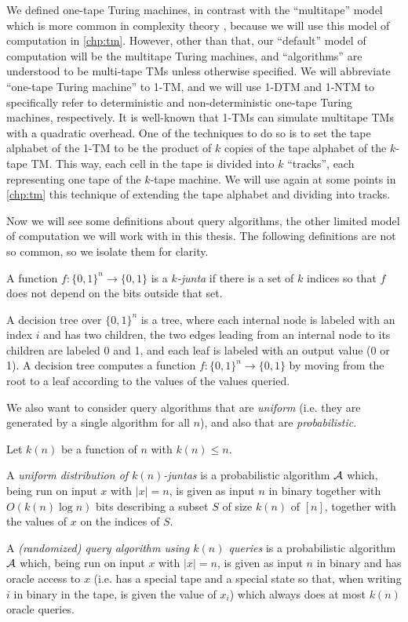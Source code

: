 We defined one-tape Turing machines, in contrast with the 
``multitape'' model which is more common in complexity theory \cite{AB09}, because 
we will use this model of computation in \cref{chp:tm}. However, other than that, 
our ``default'' model of computation will be the multitape Turing machines, and 
``algorithms'' are understood to be multi-tape TMs unless otherwise specified. 
We will abbreviate 
``one-tape Turing machine'' to 1-TM, and we will use 1-DTM and 1-NTM to specifically 
refer to deterministic and non-deterministic one-tape Turing machines, respectively.
It is well-known that 1-TMs can simulate multitape TMs with a quadratic overhead. 
One of the techniques to do so is to set the tape alphabet of the 1-TM to be the product
of $k$ copies of the tape alphabet of the $k$-tape TM. This way, each cell in the tape is divided 
into $k$ ``tracks'', each representing one tape of the $k$-tape machine. We will use again
at some points in \cref{chp:tm}
this technique of extending the tape alphabet and dividing into tracks. 

Now we will see some definitions about query algorithms, the other limited 
model of computation we will work with in this thesis. 
The following definitions are not so common, so we isolate them for clarity.

\begin{definition}
	A function $f \colon \{0, 1\}^n \to \{0, 1\}$ is a \emph{$k$-junta} if there is a set of $k$ indices
	so that $f$ does not depend on the bits outside that set.

	A decision tree over $\{0, 1\}^n$ is a tree, where each internal node
is labeled with an index $i$ and has two children, the two edges leading from an internal node to its
children are labeled 0 and 1, and each leaf is labeled with an output value (0 or 1). A decision tree
computes a function $f \colon \{0, 1\}^n \to \{0, 1\}$ by moving from the root to a leaf according to the values of the
values queried.
\end{definition}

We also want to consider query algorithms that are \emph{uniform} (i.e. they are generated by 
a single algorithm for all $n$), and also that are \emph{probabilistic}.

\begin{definition}
	Let $k(n)$ be a function of $n$ with $k(n) \leq n$.

	A \emph{uniform distribution of $k(n)$-juntas} is a probabilistic algorithm $\mathcal{A}$ which, 
	being run on input $x$ with $|x| = n$, is given as input $n$ in binary together with 
	$O(k(n) \log n)$ bits describing a subset $S$ of size $k(n)$ of $[n]$, together with the values
	of $x$ on the indices of $S$.

	A \emph{(randomized) query algorithm using $k(n)$ queries} is a probabilistic algorithm $\mathcal{A}$
	which, being run on input $x$ with $|x| = n$, is given as input $n$ in binary and has oracle access
	to $x$ (i.e. has a special tape and a special state so that, when writing $i$ in binary in the tape,
	is given the value of $x_i$) which always does at most $k(n)$ oracle queries.
\end{definition}

